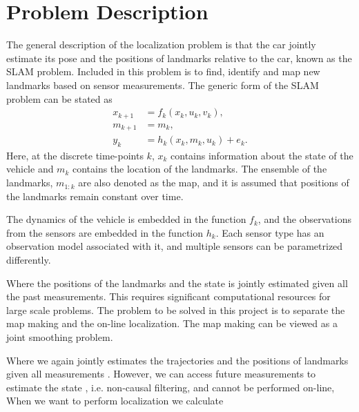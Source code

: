 \section{Problem Description}


The general description of the localization problem is that the car
jointly estimate its pose and the positions of landmarks relative to
the car, known as the \gls{SLAM} problem. Included in this problem is
to find, identify and map new landmarks based on sensor
measurements. The generic form of the \gls{SLAM} problem can be stated
as
\begin{subequations}
  \begin{align}
    x_{k+1} & = f_k(x_k, u_k,v_k), \\
    m_{k+1} & = m_k, \\
    y_k & = h_k(x_k, m_k, u_k) + e_k.
  \end{align}
\end{subequations}
Here, at the discrete time-points $k$, $x_k$ contains information about
the state of the vehicle and $m_k$ contains the location of the
landmarks. The ensemble of the landmarks, $m_{1:k}$ are also denoted as the map,
and it is assumed that positions of the landmarks remain constant over
time.

The dynamics of the vehicle is embedded in the function $f_k$, and the observations from the sensors are embedded in the function $h_k$. Each sensor type has an observation model associated with it, and multiple sensors can be parametrized differently. 

Where the positions of the landmarks and the state is jointly
estimated given all the past measurements. This requires significant
computational resources for large scale problems. The problem to be
solved in this project is to separate the map making and the on-line
localization. The map making can be viewed as a joint smoothing
problem.


Where we again jointly estimates the trajectories  and the positions
of landmarks  given all measurements . However, we can access future
measurements to estimate the state , i.e. non-causal filtering, and
cannot be performed on-line, When we want to perform localization we
calculate


